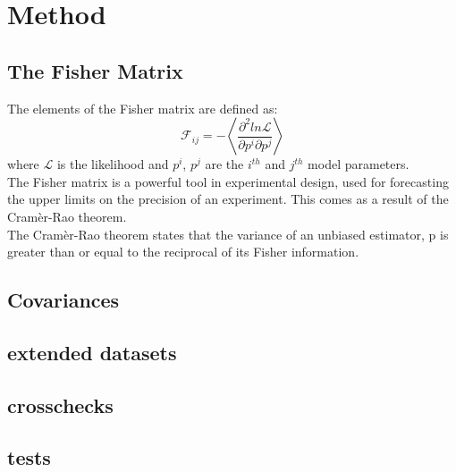 
\section{Method}
\subsection{The Fisher Matrix}
The elements of the Fisher matrix are defined as:
\begin{equation}
\mathcal{F}_{ij} = - \left \langle \frac{\partial^{2}ln{\mathcal{L}}}{\partial p^i\partial p^j } \right \rangle
\end{equation}
where $\mathcal{L}$ is the likelihood and $p^{i}$, $p^{j}$ are the $i^{th}$ and $j^{th}$ model parameters.
\\
The Fisher matrix is a powerful tool in experimental design, used for forecasting the upper limits on the precision of an experiment. This comes as a result of the Cram\`{e}r-Rao theorem.
\\
The Cram\`{e}r-Rao theorem states that the variance of an unbiased estimator, p is greater than or equal to the reciprocal of its Fisher information.


\subsection{Covariances}
\subsection{extended datasets}
\subsection{crosschecks}
\subsection{tests}
